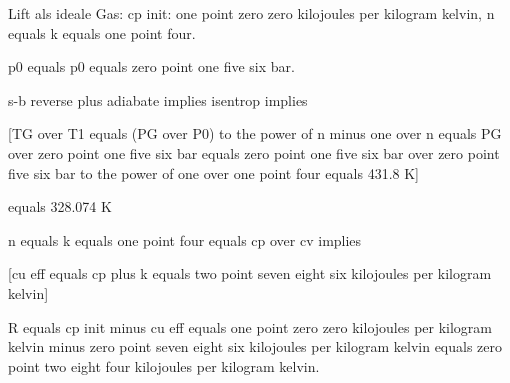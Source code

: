 Lift als ideale Gas: cp init: one point zero zero kilojoules per kilogram kelvin, n equals k equals one point four.

p0 equals p0 equals zero point one five six bar.

s-b reverse plus adiabate implies isentrop implies 

[TG over T1 equals (PG over P0) to the power of n minus one over n equals PG over zero point one five six bar equals zero point one five six bar over zero point five six bar to the power of one over one point four equals 431.8 K]

equals 328.074 K

n equals k equals one point four equals cp over cv implies 

[cu eff equals cp plus k equals two point seven eight six kilojoules per kilogram kelvin]

R equals cp init minus cu eff equals one point zero zero kilojoules per kilogram kelvin minus zero point seven eight six kilojoules per kilogram kelvin equals zero point two eight four kilojoules per kilogram kelvin.